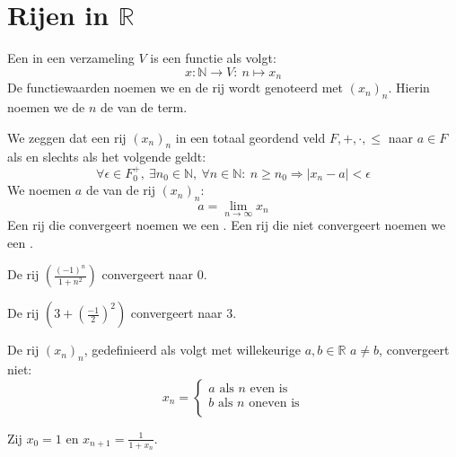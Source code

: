 \documentclass[main.tex]{subfiles}
\begin{document}
\section{Rijen in $\mathbb{R}$}
\label{sec:rijen-in-r}

\begin{de}
  Een  in een verzameling $V$ is een functie als volgt:
  \[ x: \mathbb{N} \rightarrow V:\ n\mapsto x_{n} \]
  De functiewaarden noemen we  en de rij wordt genoteerd met $(x_{n})_{n}$.
  Hierin noemen we de $n$ de  van de term.
\end{de}

\begin{de}
  We zeggen dat een rij $(x_{n})_{n}$ in een totaal geordend veld $F,+,\cdot,\le$  naar $a\in F$ als en slechts als het volgende geldt:
  \[ \forall \epsilon \in F_{0}^{+},\ \exists n_{0}\in \mathbb{N},\ \forall n\in \mathbb{N}:\ n \ge n_{0} \Rightarrow |x_{n}-a| < \epsilon \]
  We noemen $a$ de  van de rij $(x_{n})_{n}$:
  \[ a = \lim_{n\rightarrow \infty}x_{n} \]
  Een rij die convergeert noemen we een .
  Een rij die niet convergeert noemen we een .
\end{de}

\begin{vb}
  De rij $\left(\frac{(-1)^{n}}{1+n^{2}}\right)$ convergeert naar $0$.
\end{vb}

\begin{vb}
  De rij $\left( 3 + \left(\frac{-1}{2
}\right)^{2}\right)$ convergeert naar $3$.
\end{vb}

\begin{vb}
  De rij $(x_{n})_{n}$, gedefinieerd als volgt met willekeurige $a,b\in \mathbb{R}$ $a\neq b$, convergeert niet:
  \[
  x_{n} = 
  \begin{cases}
    a \text{ als } n \text{ even is}\\
    b \text{ als } n \text{ oneven is}\\
  \end{cases}
  \]
\end{vb}

\begin{vb}
  Zij $x_{0}=1$ en $x_{n+1} = \frac{1}{1+x_{n}}$.
\end{vb}
\end{document}

